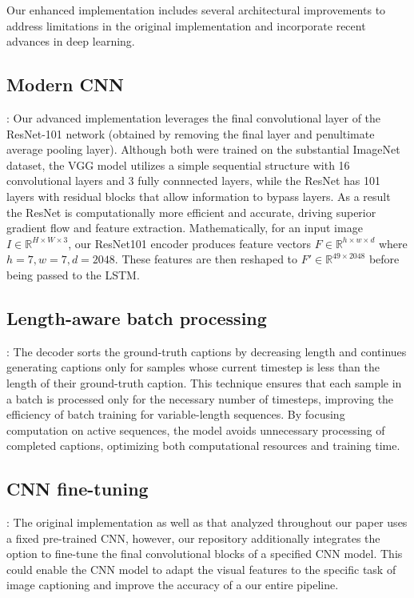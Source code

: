 \documentclass{article}
\theoremstyle{plain}
\theoremstyle{definition}
\theoremstyle{remark}
\begin{document}
Our enhanced implementation includes several architectural improvements to address limitations in the original implementation and incorporate recent advances in deep learning.
    
\subsection{Modern CNN}: Our advanced implementation leverages the final convolutional layer of the ResNet-101 network (obtained by removing the final layer and penultimate average pooling layer). Although both were trained on the substantial ImageNet dataset, the VGG model utilizes a simple sequential structure with 16 convolutional layers and 3 fully connnected layers, while the ResNet has 101 layers with residual blocks that allow information to bypass layers. As a result the ResNet is computationally more efficient and accurate, driving superior gradient flow and feature extraction. Mathematically, for an input image $I \in \mathbb{R}^{H \times W \times 3}$, our ResNet101 encoder produces feature vectors $F \in \mathbb{R}^{h \times w \times d}$ where $h=7, w=7, d=2048$. These features are then reshaped to $F' \in \mathbb{R}^{49 \times 2048}$ before being passed to the LSTM.

\subsection{Length-aware batch processing}: The decoder sorts the ground-truth captions by decreasing length and continues generating captions only for samples whose current timestep is less than the length of their ground-truth caption. This technique ensures that each sample in a batch is processed only for the necessary number of timesteps, improving the efficiency of batch training for variable-length sequences. By focusing computation on active sequences, the model avoids unnecessary processing of completed captions, optimizing both computational resources and training time.

\subsection{CNN fine-tuning}: The original implementation as well as that analyzed throughout our paper uses a fixed pre-trained CNN, however, our repository additionally integrates the option to fine-tune the final convolutional blocks of a specified CNN model. This could enable the CNN model to adapt the visual features to the specific task of image captioning and improve the accuracy of a our entire pipeline. 
\end{document}
